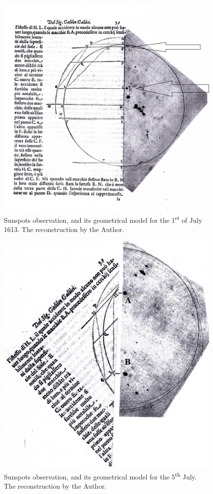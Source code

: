 \begin{artengenv}
\begin{figure}[h]
	\centering
	\includegraphics[width=1\textwidth]{ART_Sierotowicz/Sierotowicz_img4.jpg} 
	\caption{Sunspots observation, and its geometrical model for the 1\textsuperscript{st} of July 1613. The reconstruction
		by the Author.}
\end{figure}

\begin{figure}[h]
	\centering
	\includegraphics[width=1\textwidth]{ART_Sierotowicz/Sierotowicz_img5.jpg} 
	\caption{Sunspots observation, and its geometrical model for the 5\textsuperscript{th} July. The reconstruction by the
		Author.}
\end{figure}




\end{artengenv}
